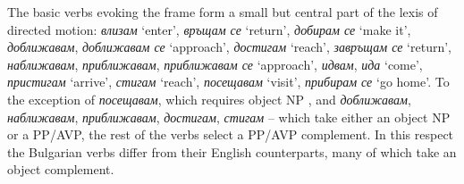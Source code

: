 \documentclass[output=paper,colorlinks,citecolor=brown]{langscibook}
\begin{document}
The basic verbs evoking the  frame form a small but central part of the lexis of directed motion: \textit{влизам} `enter’, \textit{връщам се} `return’, \textit{добирам се} `make it’, \textit{доближавам}, \textit{доближавам се} `approach’, \textit{достигам} `reach’, \textit{завръщам се} `return’, \textit{наближавам}, \textit{приближавам}, \textit{приближавам се} `approach’, \textit{идвам}, \textit{ида} `come’, \textit{пристигам} `arrive’, \textit{стигам} `reach’, \textit{посещавам} `visit’, \textit{прибирам се} `go home’. To the exception of \textit{посещавам}, which requires object NP , and \textit{доближавам}, \textit{наближавам}, \textit{приближавам}, \textit{достигам}, \textit{стигам} -- which take either an object NP or a PP\slash AVP, the rest of the verbs select a PP/AVP complement. In this respect the Bulgarian verbs differ from their English counterparts, many of which take an object  complement.
\end{document}

